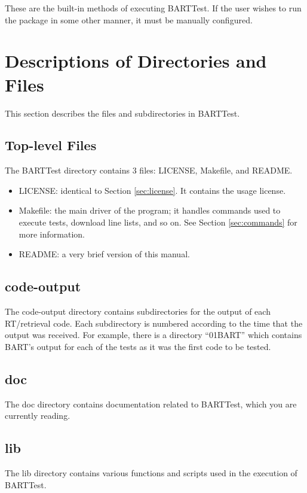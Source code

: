 \documentclass[letterpaper, 12pt]{article}
\begin{document}
These are the built-in methods of executing BARTTest. If the user wishes to 
run the package in some other manner, it must be manually configured.

\section{Descriptions of Directories and Files}
\label{sec:files}

This section describes the files and subdirectories in BARTTest.

\subsection{Top-level Files}
The BARTTest directory contains 3 files: LICENSE, Makefile, and README.

\begin{itemize} \itemsep0pt
  \item LICENSE: identical to Section \ref{sec:license}. It contains the 
        usage license.
  \item Makefile: the main driver of the program; it handles commands used 
        to execute tests, download line lists, and so on. See Section 
        \ref{sec:commands} for more information.
  \item README: a very brief version of this manual.
\end{itemize}

\subsection{code-output}
\label{sec:output}
The code-output directory contains subdirectories for the output of each RT/retrieval code. 
Each subdirectory is numbered according to the time that the output was received. 
For example, there is a directory ``01BART'' which contains BART's output for each of the tests as it was the first code to be tested.

\subsection{doc}
The doc directory contains documentation related to BARTTest, which you are currently reading.

\subsection{lib}
The lib directory contains various functions and scripts used in the execution 
of BARTTest.
\end{document}
